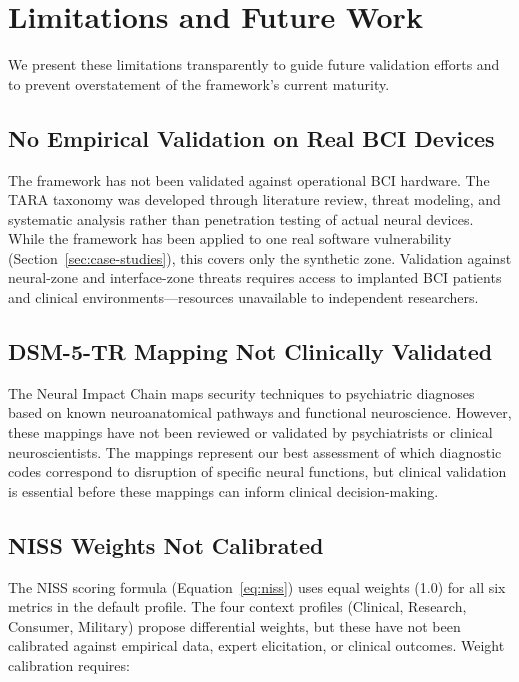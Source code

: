 
\section{Limitations and Future Work}
\label{sec:limitations}

We present these limitations transparently to guide future validation efforts and
to prevent overstatement of the framework's current maturity.

\subsection{No Empirical Validation on Real BCI Devices}

The \qif framework has not been validated against operational BCI hardware.
The TARA taxonomy was developed through literature review, threat modeling, and
systematic analysis rather than penetration testing of actual neural devices.
While the framework has been applied to one real software vulnerability
(Section~\ref{sec:case-studies}), this covers only the synthetic zone. Validation
against neural-zone and interface-zone threats requires access to implanted BCI
patients and clinical environments---resources unavailable to independent
researchers.

\subsection{DSM-5-TR Mapping Not Clinically Validated}

The Neural Impact Chain maps security techniques to psychiatric diagnoses based
on known neuroanatomical pathways and functional neuroscience. However, these
mappings have not been reviewed or validated by psychiatrists or clinical
neuroscientists. The mappings represent our best assessment of which diagnostic
codes correspond to disruption of specific neural functions, but clinical
validation is essential before these mappings can inform clinical decision-making.

\subsection{NISS Weights Not Calibrated}

The NISS scoring formula (Equation~\ref{eq:niss}) uses equal weights (1.0) for
all six metrics in the default profile. The four context profiles (Clinical,
Research, Consumer, Military) propose differential weights, but these have not
been calibrated against empirical data, expert elicitation, or clinical outcomes.
Weight calibration requires:

